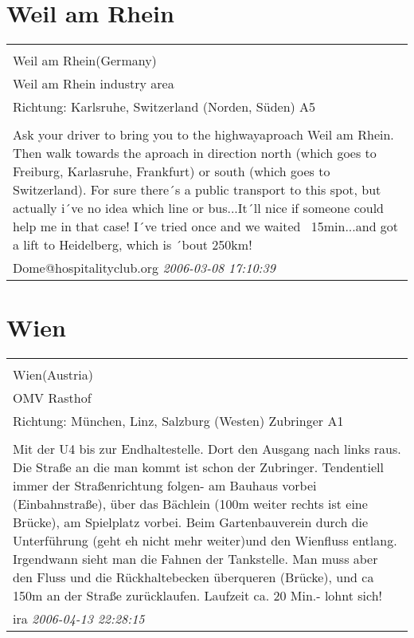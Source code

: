 \documentclass[a4paper,12pt]{article}
\begin{document}
\section{Weil am Rhein}
\begin{tabular}{|p{13cm}|}
\hline\\
Weil am Rhein(Germany)\\
Weil am Rhein industry area\\
Richtung: Karlsruhe, Switzerland (Norden, Süden) A5 \\
\hline\\
Ask your driver to bring you to the highwayaproach Weil am Rhein. Then walk towards the aproach in direction north (which goes to Freiburg, Karlasruhe, Frankfurt) or south (which goes to Switzerland).
For sure there´s a public transport to this spot, but actually i´ve no idea which line or bus...It´ll nice if someone could help me in that case!
I´ve tried once and we waited ~15min...and got a lift to Heidelberg, which is ´bout 250km! \\
Dome@hospitalityclub.org \textit{ 2006-03-08 17:10:39 }\\\hline
\end{tabular}


\section{Wien}
\begin{tabular}{|p{13cm}|}
\hline\\
Wien(Austria)\\
OMV Rasthof\\
Richtung: München, Linz, Salzburg (Westen) Zubringer A1 \\
\hline\\
Mit der U4 bis zur Endhaltestelle. Dort den Ausgang nach links raus. Die Straße an die man kommt ist schon der Zubringer. Tendentiell immer der Straßenrichtung folgen- am Bauhaus vorbei (Einbahnstraße), über das Bächlein (100m weiter rechts ist eine Brücke), am Spielplatz vorbei. Beim Gartenbauverein durch die Unterführung (geht eh nicht mehr weiter)und den Wienfluss entlang. Irgendwann sieht man die Fahnen der Tankstelle. Man muss aber den Fluss und die Rückhaltebecken überqueren (Brücke), und ca 150m an der Straße zurücklaufen. Laufzeit ca. 20 Min.- lohnt sich! \\
ira \textit{ 2006-04-13 22:28:15 }\\\hline
\end{tabular}
\end{document}
